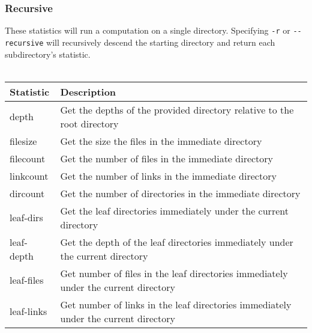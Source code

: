 \subsubsection{Recursive}
These statistics will run a computation on a single
directory. Specifying \texttt{-r} or \texttt{-{}-recursive} will
recursively descend the starting directory and return each
subdirectory's statistic.
\\\\
\begin{table}[h!]
  \begin{tabular} {| l | l |}
    \hline
    Statistic & Description \\
    \hline
    depth & Get the depths of the provided directory relative to the root
    directory \\
    \hline
    filesize & Get the size the files in the immediate directory \\
    \hline
    filecount & Get the number of files in the immediate directory \\
    \hline
    linkcount & Get the number of links in the immediate directory \\
    \hline
    dircount & Get the number of directories in the immediate directory \\
    \hline
    leaf-dirs & Get the leaf directories immediately under the current
    directory \\
    \hline
    leaf-depth & Get the depth of the leaf directories immediately under
    the current directory \\
    \hline
    leaf-files & Get number of files in the leaf directories immediately
    under the current directory \\
    \hline
    leaf-links & Get number of links in the leaf directories immediately
    under the current directory \\
    \hline
  \end{tabular}
\end{table}

